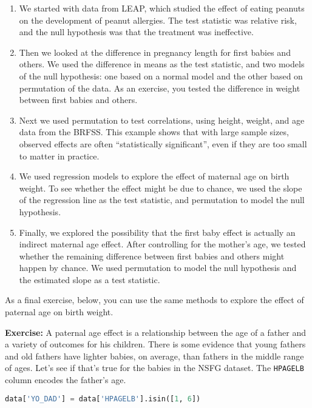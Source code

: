 \begin{enumerate}
\def\labelenumi{\arabic{enumi}.}
\item
  We started with data from LEAP, which studied the effect of eating
  peanuts on the development of peanut allergies. The test statistic was
  relative risk, and the null hypothesis was that the treatment was
  ineffective.
\item
  Then we looked at the difference in pregnancy length for first babies
  and others. We used the difference in means as the test statistic, and
  two models of the null hypothesis: one based on a normal model and the
  other based on permutation of the data. As an exercise, you tested the
  difference in weight between first babies and others.
\item
  Next we used permutation to test correlations, using height, weight,
  and age data from the BRFSS. This example shows that with large sample
  sizes, observed effects are often ``statistically significant'', even
  if they are too small to matter in practice.
\item
  We used regression models to explore the effect of maternal age on
  birth weight. To see whether the effect might be due to chance, we
  used the slope of the regression line as the test statistic, and
  permutation to model the null hypothesis.
\item
  Finally, we explored the possibility that the first baby effect is
  actually an indirect maternal age effect. After controlling for the
  mother's age, we tested whether the remaining difference between first
  babies and others might happen by chance. We used permutation to model
  the null hypothesis and the estimated slope as a test statistic.
\end{enumerate}

As a final exercise, below, you can use the same methods to explore the
effect of paternal age on birth weight.

\textbf{Exercise:} A paternal age effect is a relationship between the
age of a father and a variety of outcomes for his children. There is
some evidence that young fathers and old fathers have lighter babies, on
average, than fathers in the middle range of ages. Let's see if that's
true for the babies in the NSFG dataset. The
\passthrough{\lstinline!HPAGELB!} column encodes the father's age.

\begin{lstlisting}[language=Python,style=source]
data['YO_DAD'] = data['HPAGELB'].isin([1, 6])
\end{lstlisting}

